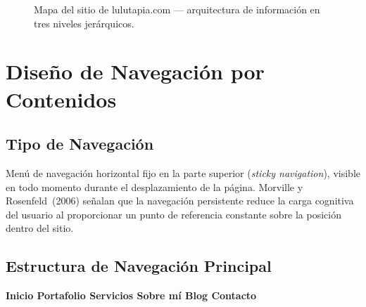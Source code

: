 \documentclass[12pt, letterpaper]{article}
\begin{document}
\begin{figure}[H]
\caption{Mapa del sitio de lulutapia.com — arquitectura de información en tres niveles jerárquicos.}
\label{fig:mapa-sitio}
\end{figure}


\section{Diseño de Navegación por Contenidos}

\subsection{Tipo de Navegación}

Menú de navegación horizontal fijo en la parte superior (\textit{sticky navigation}), visible en todo momento durante el desplazamiento de la página. Morville y Rosenfeld~(2006) señalan que la navegación persistente reduce la carga cognitiva del usuario al proporcionar un punto de referencia constante sobre la posición dentro del sitio.

\subsection{Estructura de Navegación Principal}

\begin{tcolorbox}[
  colback=luluDark, colframe=luluDark,
  arc=4pt, boxrule=0pt,
  left=8pt, right=8pt, top=8pt, bottom=8pt
]
\centering
{\small\bfseries\color{white}
Inicio \quad\textbar\quad Portafolio \quad\textbar\quad Servicios \quad\textbar\quad Sobre mí \quad\textbar\quad Blog \quad\textbar\quad Contacto}
\end{tcolorbox}
\end{document}
